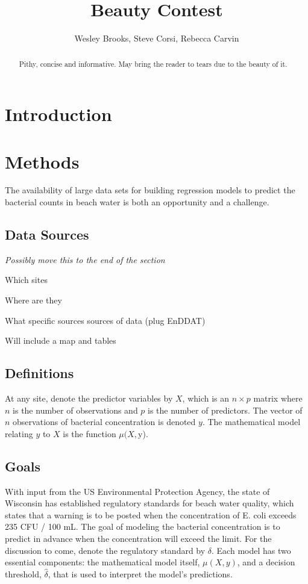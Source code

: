 \documentclass[english]{article}\usepackage[]{graphicx}\usepackage[]{color}
\numberwithin{equation}{section}
\numberwithin{figure}{section}
\renewcommand\[{\begin{equation}}
\renewcommand\]{\end{equation}}
\begin{document}
\title{Beauty Contest}


\author{Wesley Brooks, Steve Corsi, Rebecca Carvin}
\maketitle
\begin{abstract}
Pithy, concise and informative. May bring the reader to tears due
to the beauty of it.
\end{abstract}

\section{Introduction}


\section{Methods}

The availability of large data sets for building regression models
to predict the bacterial counts in beach water is both an opportunity
and a challenge. 


\subsection{Data Sources}

\emph{Possibly move this to the end of the section}

Which sites

Where are they

What specific sources sources of data (plug EnDDAT)

Will include a map and tables


\subsection{Definitions}

At any site, denote the predictor variables by $X$, which is an $n\times p$
matrix where $n$ is the number of observations and $p$ is the number
of predictors. The vector of $n$ observations of bacterial concentration
is denoted $y$. The mathematical model relating $y$ to $X$ is the
function $\mu(X,$y).


\subsection{Goals}

With input from the US Environmental Protection Agency, the state
of Wisconsin has established regulatory standards for beach water
quality, which states that a warning is to be posted when the concentration
of E. coli exceeds 235 CFU / 100 mL.  The goal of modeling the bacterial
concentration is to predict in advance when the concentration will
exceed the limit. For the discussion to come, denote the regulatory
standard by $\delta$. Each model has two essential components: the
mathematical model itself, $\mu(X,y)$, and a decision threshold,
$\hat{{\delta}}$, that is used to interpret the model's predictions.
\end{document}
